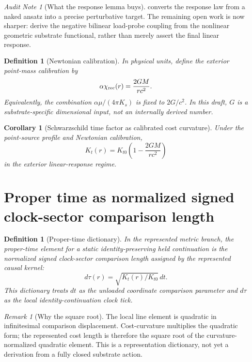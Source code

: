\documentclass[11pt]{article}
\newtheorem{corollary}[theorem]{Corollary}
\newtheorem{definition}[theorem]{Definition}
\theoremstyle{remark}
\newtheorem{remark}[theorem]{Remark}
\newtheorem{audit}[theorem]{Audit Note}
\begin{document}
\begin{audit}[What the response lemma buys]
 converts the response law from a naked ansatz into a precise perturbative target.  The remaining open work is now sharper: derive the negative bilinear load-probe coupling from the nonlinear geometric substrate functional, rather than merely assert the final linear response.
\end{audit}

\begin{definition}[Newtonian calibration]
In physical units, define the exterior point-mass calibration by
\[
        \alpha\chi_{\rm rec}(r)=\frac{2GM}{rc^2}.
\]
Equivalently, the combination \(\alpha\mu/(4\pi K_s)\) is fixed to \(2G/c^2\).  In this draft, \(G\) is a substrate-specific dimensional input, not an internally derived number.
\end{definition}

\begin{corollary}[Schwarzschild time factor as calibrated cost curvature]
\label{cor:schwarzschild-factor}
Under the point-source profile and Newtonian calibration,
\[
        K_t(r)=K_{t0}\left(1-\frac{2GM}{rc^2}\right)
\]
in the exterior linear-response regime.
\end{corollary}

\section{Proper time as normalized signed clock-sector comparison length}

\begin{definition}[Proper-time dictionary]
In the represented metric branch, the proper-time element for a static identity-preserving held continuation is the normalized signed clock-sector comparison length assigned by the represented causal kernel:
\[
        d\tau(r)=\sqrt{K_t(r)/K_{t0}}\,dt.
\]
This dictionary treats \(dt\) as the unloaded coordinate comparison parameter and \(d\tau\) as the local identity-continuation clock tick.
\end{definition}

\begin{remark}[Why the square root]
The local line element is quadratic in infinitesimal comparison displacement.  Cost-curvature multiplies the quadratic form; the represented cost length is therefore the square root of the curvature-normalized quadratic element.  This is a representation dictionary, not yet a derivation from a fully closed substrate action.
\end{remark}
\end{document}
